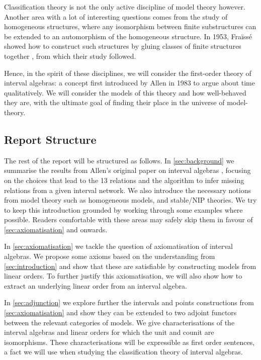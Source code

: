 Classification theory is not the only active discipline of model theory however. Another
area with a lot of interesting questions comes from the study of homogeneous structures,
where any isomorphism between finite substructures can be extended to an automorphism of
the homogeneous structure. In 1953, Fraïssé showed how to construct such structures
by gluing classes of finite structures together \cite{fraisse1953certaines},
from which their study followed.

Hence, in the spirit of these disciplines, we will consider the first-order theory of
interval algebras: a concept first introduced by Allen in 1983 to argue about time
qualitatively. We will consider the models of this theory and how well-behaved they are, with the
ultimate goal of finding their place in the universe of model-theory.

\subsection{Report Structure}%
\label{sub:report_structure}

The rest of the report will be structured as follows. In
\cref{sec:background} we summarise the results from Allen's original paper
on interval algebras \cite{allen83}, focusing on the choices that lead to
the 13 relations and the algorithm to infer missing relations from a given
interval network. We also introduce the necessary notions from model theory
such as homogeneous models, and stable/NIP theories. We try to keep this
introduction grounded by working through some examples where possible.
Readers comfortable with these areas may safely skip them in favour of
\cref{sec:axiomatisation} and onwards.

In \cref{sec:axiomatisation} we tackle the question of axiomatisation of
interval algebras. We propose some axioms based on the understanding from
\cref{sec:introduction} and show that these are satisfiable by
constructing models from linear orders. To further justify this
axiomatisation, we will also show how to extract an underlying linear order from an interval
algebra.

In \cref{sec:adjunction} we explore further the intervals and points
constructions from \cref{sec:axiomatisation} and show they can be extended to two adjoint
functors between the relevant categories of models. We give characterisations of
the interval algebras and linear orders for which the unit and counit are isomorphisms.
These characterisations will be expressible as first order sentences, a fact we will use
when studying the classification theory of interval algebras.

